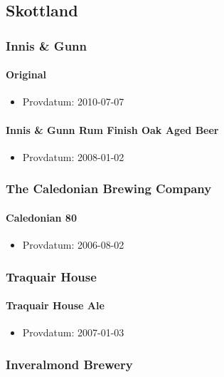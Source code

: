\documentclass[11pt]{article}
\begin{document}
\subsection{Skottland}
\label{sec:orgd86522d}
\subsubsection{Innis \& Gunn}
\label{sec:org0317d63}
\paragraph{Original}
\label{sec:orgfcbc995}
\begin{itemize}
\item Provdatum: 2010-07-07
\end{itemize}
\paragraph{Innis \& Gunn Rum Finish Oak Aged Beer}
\label{sec:orga4e596d}
\begin{itemize}
\item Provdatum: 2008-01-02
\end{itemize}
\subsubsection{The Caledonian Brewing Company}
\label{sec:org18ad091}
\paragraph{Caledonian 80}
\label{sec:org81e4db6}
\begin{itemize}
\item Provdatum: 2006-08-02
\end{itemize}
\subsubsection{Traquair House}
\label{sec:org349c3e9}
\paragraph{Traquair House Ale}
\label{sec:org289920d}
\begin{itemize}
\item Provdatum: 2007-01-03
\end{itemize}
\subsubsection{Inveralmond Brewery}
\label{sec:orga3e2638}
\end{document}
